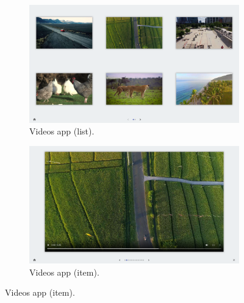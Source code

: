 \begin{figure}[p]
    \begin{subfigure}{.47\textwidth}
        \centering
        \includegraphics[width=.96\linewidth]{Figures/LUI/UI/videos-list.pdf} 
        \vspace{-5pt}
        \captionsetup{width=.9\linewidth}
        \caption{Videos app (list).}
        \label{fig:lui:screenshots:videos-list}
    \end{subfigure}
    \begin{subfigure}{.47\textwidth}
        \centering
        \includegraphics[width=.96\linewidth]{Figures/LUI/UI/videos-fullscreen.pdf}  
        \vspace{-5pt}
        \captionsetup{width=.9\linewidth}
        \caption{Videos app (item).}
        \label{fig:lui:screenshots:videos-fullscreen}
    \end{subfigure}


\end{figure}
